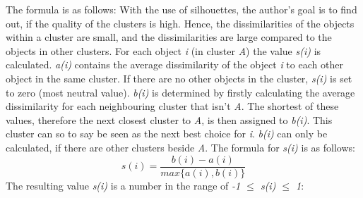 
  The formula is as follows:
  With the use of silhouettes, the author's goal is to find out, if the quality of the clusters is high. Hence, the dissimilarities of the objects within a cluster are small, and the dissimilarities are large compared to the objects in other clusters. For each object \textit{i} (in cluster \textit{A}) the value \textit{s(i)} is calculated. \textit{a(i)} contains the average dissimilarity of the object \textit{i} to each other object in the same cluster. If there are no other objects in the cluster, \textit{s(i)} is set to zero (most neutral value). \textit{b(i)} is determined by firstly calculating the average dissimilarity for each neighbouring cluster that isn't \textit{A}. The shortest of these values, therefore the next closest cluster to \textit{A}, is then assigned to \textit{b(i)}. This cluster can so to say be seen as the next best choice for \textit{i}. \textit{b(i)} can only be calculated, if there are other clusters beside \textit{A}. The formula for \textit{s(i)} is as follows:
  \[
    s(i) = \frac{b(i) - a(i)}{max\{a(i), b(i)\}}  
  \]
  The resulting value \textit{s(i)} is a number in the range of \textit{-1 $\leq$ \textit{s(i)} $\leq$ 1}:


